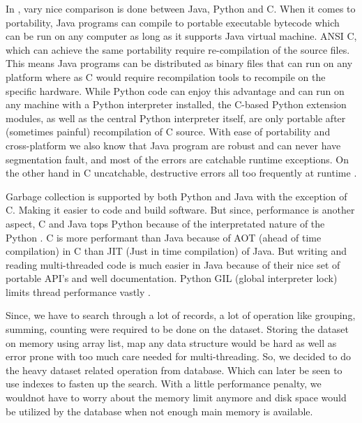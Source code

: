 In \cite{hugunin1997Python}, vary nice comparison is done between Java, Python and C. When it comes to portability, Java programs can compile to portable executable bytecode which can be run on any computer as long as it supports Java virtual machine. ANSI C, which can achieve the same portability require re-compilation of the source files. This means Java programs can be distributed as binary files that can run on any platform where as C would require recompilation tools to recompile on the specific hardware. While Python code can enjoy this advantage and can run on any machine with a Python interpreter installed, the C-based Python extension modules, as well as the central Python interpreter itself, are only portable after (sometimes painful) recompilation of C source. With ease of portability and cross-platform we also know that Java program are robust and can never have segmentation fault, and most of the errors are catchable runtime exceptions. On the other hand in C uncatchable, destructive errors all too frequently at runtime \cite{hugunin1997Python}.

Garbage collection is supported by both Python and Java with the exception of C. Making it easier to code and build software. But since, performance is another aspect, C and Java tops Python because of the interpretated nature of the Python \cite{hugunin1997Python}. C is more performant than Java because of AOT (ahead of time compilation) in C than JIT (Just in time compilation) of Java. But writing and reading multi-threaded code is much easier in Java because of their nice set of portable API's and well documentation. Python GIL (global interpreter lock) limits thread performance vastly \cite{beazley2010understanding}.

Since, we have to search through a lot of records, a lot of operation like grouping, summing, counting were required to be done on the dataset. Storing the dataset on memory using array list, map any data structure would be hard as well as error prone with too much care needed for multi-threading. So, we decided to do the heavy dataset related operation from database. Which can later be seen to use indexes to fasten up the search. With a little performance penalty, we wouldnot have to worry about the memory limit anymore and disk space would be utilized by the database when not enough main memory is available. 


